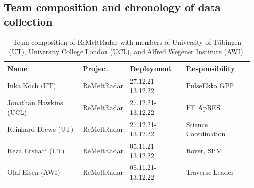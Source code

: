 \documentclass[a4paper,12pt]{article}
\begin{document}
\subsection{Team composition and chronology of data collection}
\begin{table}
\begin{tabular}{llll}
  \rowcolor{gray!50}
  Name & Project& Deployment& Responsibility\\
  \hline
  Inka Koch (UT) & ReMeltRadar & 27.12.21-13.12.22& PulseEkko GPR\\
  Jonathan Hawkins (UCL) & ReMeltRadar  &27.12.21-13.12.22& HF ApRES\\
  Reinhard Drews (UT) & ReMeltRadar  &27.12.21-13.12.22& Science Coordination\\
  Reza Ershadi (UT) & ReMeltRadar &05.11.21-13.12.22& Rover, SPM\\
  Olaf Eisen (AWI) & ReMeltRadar  &05.11.21-13.12.22& Traverse Leader\\
  \hline
\end{tabular}
\caption{\label{TableGPR}Team composition of ReMeltRadar with members of University of Tübingen (UT), University College London (UCL), and Alfred Wegener Institute (AWI).}
\end{table}
\end{document}
